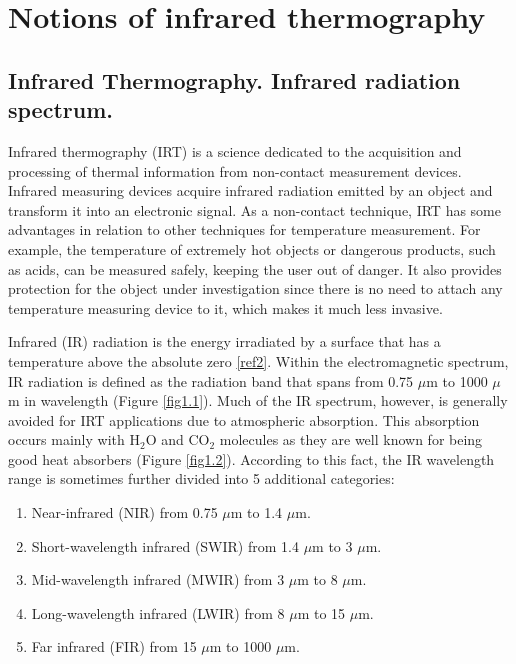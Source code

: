 \pagestyle{standard}

\chapter{Notions of infrared thermography}\label{chapter1}

	\thispagestyle{chapter-first-page}
	
	\section{Infrared Thermography. Infrared radiation spectrum.}\label{section1.1}
	
		Infrared thermography (IRT) is a science dedicated to the acquisition and processing of thermal information from non-contact measurement devices. Infrared measuring devices acquire infrared radiation emitted by an object and transform it into an electronic signal. As a non-contact technique, IRT has some advantages in relation to other techniques for temperature measurement. For example, the temperature of extremely hot objects or dangerous products, such as acids, can be measured safely, keeping the user out of danger. It also provides protection for the object under investigation since there is no need to attach any temperature measuring device to it, which makes it much less invasive.
		
		Infrared (IR) radiation is the energy irradiated by a surface that has a temperature above the absolute zero \ref{ref2}. Within the electromagnetic spectrum, IR radiation is defined as the radiation band that spans from 0.75 $\mu$m to 1000 $\mu$m in wavelength (Figure \ref{fig1.1}). Much of the IR spectrum, however, is generally avoided for IRT applications due to atmospheric absorption. This absorption occurs mainly with H$_{2}$O and CO$_{2}$ molecules as they are well known for being good heat absorbers (Figure \ref{fig1.2}). According to this fact, the IR wavelength range is sometimes further divided into 5 additional categories:

		\begin{enumerate}[label={\Roman*.}]
			\item Near-infrared (NIR) from 0.75 $\mu$m to 1.4 $\mu$m.
			\item Short-wavelength infrared (SWIR) from 1.4 $\mu$m to 3 $\mu$m.
			\item Mid-wavelength infrared (MWIR) from 3 $\mu$m to 8 $\mu$m.
			\item Long-wavelength infrared (LWIR) from 8 $\mu$m to 15 $\mu$m.
			\item Far infrared (FIR) from 15 $\mu$m to 1000 $\mu$m.
		\end{enumerate}
		
